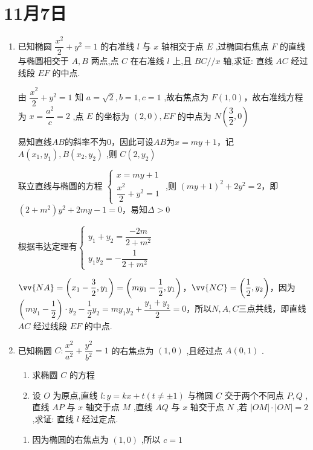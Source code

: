 \section*{11月7日}
\begin{enumerate}
    \item  已知椭圆 $\dfrac{{x}^{2}}{2} + {y}^{2} = 1$ 的右准线 $l$ 与 $x$ 轴相交于点 $E$ ,过椭圆右焦点 $F$ 的直线与椭圆相交于 $A,B$ 两点,点 $C$ 在右准线 $l$ 上,且 ${BC}//x$ 轴,求证: 直线 ${AC}$ 经过线段 ${EF}$ 的中点.
    
    \begin{jieda}
        由 $\dfrac{{x}^{2}}{2} + {y}^{2} = 1$ 知 $a = \sqrt{2},b = 1,c = 1$ ,故右焦点为 $F\left( {1,0}\right)$，故右准线方程为 $x = \dfrac{{a}^{2}}{c} = 2$ ,点 $E$ 的坐标为 $\left( {2,0}\right) ,{EF}$ 的中点为 $N\left( {\dfrac{3}{2},0}\right)$

        易知直线$AB$的斜率不为0，因此可设$AB$为$x = my+1$，记 $A\left( {{x}_{1},{y}_{1}}\right) ,B\left( {{x}_{2},{y}_{2}}\right)$ ,则 $C\left( {2,{y}_{2}}\right)$
        
        联立直线与椭圆的方程 $\left\{  \begin{array}{l} x = my+1 \\  \dfrac{{x}^{2}}{2} + {y}^{2} = 1 \end{array}\right.$ ,则 $(my+1)^2 + 2y^2 = 2$，即$(2+m^2)y^2+2my-1 = 0$，易知$\Delta>0$

        根据韦达定理有$\left\{\begin{array}{l}
             y_1+y_2 = \dfrac{-2m}{2+m^2} \\
             y_1y_2 = -\dfrac{1}{2+m^2}
        \end{array}\right.$

        $\vv{NA} = \left(x_1-\dfrac{3}{2}, y_1\right) = \left(my_1-\dfrac{1}{2}, y_1\right)$，$\vv{NC} = \left(\dfrac{1}{2}, y_2\right)$，因为$\left(my_1-\dfrac{1}{2}\right)\cdot y_2 - \dfrac{1}{2}y_2 = my_1y_2 + \dfrac{y_1+y_2}{2} = 0$，所以$N,A,C$三点共线，即直线 ${AC}$ 经过线段 ${EF}$ 的中点.
    \end{jieda}
    
    \item 已知椭圆 $C : \dfrac{{x}^{2}}{{a}^{2}} + \dfrac{{y}^{2}}{{b}^{2}} = 1$ 的右焦点为 $\left( {1,0}\right)$ ,且经过点 $A\left( {0,1}\right)$ .
    \begin{enumerate}
        \item 求椭圆 $C$ 的方程
        \item 设 $O$ 为原点,直线 $l : y = {kx} + t\left( {t \neq   \pm  1}\right)$ 与椭圆 $C$ 交于两个不同点 $P,Q$ ,直线 ${AP}$ 与 $x$ 轴交于点 $M$ ,直线 ${AQ}$ 与 $x$ 轴交于点 $N$ ,若 $\left| {OM}\right|  \cdot  \left| {ON}\right|  = 2$ ,求证: 直线 $l$ 经过定点.
    \end{enumerate}
    \begin{jieda}
    \begin{enumerate}
        \item 因为椭圆的右焦点为 $\left( {1,0}\right)$ ,所以 $c = 1$
        

\end{enumerate}
\end{jieda}
\end{enumerate}
